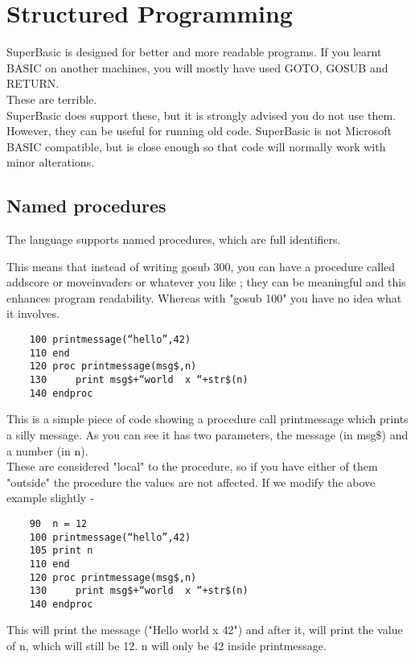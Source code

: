 \chapter{Structured Programming}

SuperBasic is designed for better and more readable programs. If you learnt BASIC on another machines, you will mostly have used GOTO, GOSUB and RETURN.\\

These are terrible.\\

SuperBasic does support these, but it is strongly advised you do not use them. However, they can be useful for running old code. SuperBasic is not Microsoft BASIC compatible, but is close enough so that code will normally work with minor alterations.

\section{Named procedures}

The language supports named procedures, which are full identifiers.

This means that instead of writing gosub 300, you can have a procedure called addscore or moveinvaders or whatever you like ; they can be meaningful and this enhances program readability. Whereas with "gosub 100" you have no idea what it involves.\\

\begin{verbatim}
	100 printmessage(“hello”,42)
	110 end
	120 proc printmessage(msg$,n)
	130 	print msg$+“world  x “+str$(n)
	140 endproc
\end{verbatim}

This is a simple piece of code showing a procedure call printmessage which prints a silly message. As you can see it has two parameters, the message (in msg\$) and a number (in n). \\

These are considered "local" to the procedure, so if you have either of them "outside" the procedure the values are not affected. If we modify the above example slightly -

\begin{verbatim}
	90  n = 12
	100 printmessage(“hello”,42)
	105 print n
	110 end
	120 proc printmessage(msg$,n)
	130 	print msg$+“world  x “+str$(n)
	140 endproc
\end{verbatim}

This will print the message ("Hello world x 42") and after it, will print the value of n, which will still be 12. n will only be 42 inside printmessage.\\

